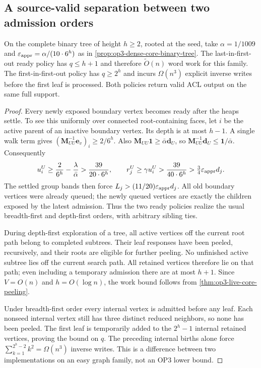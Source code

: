 \subsection{A source-valid separation between two admission orders}

\begin{proposition}
\label{prop:op3-live-core-binary-order}
On the complete binary tree of height $h\geq2$, rooted at the seed, take
$\alpha=1/1009$ and $\varepsilon_{\mathrm{appr}}=\alpha/(10\cdot6^h)$ as in
\cref{prop:op3-dense-core-binary-tree}. The last-in-first-out ready policy
has $q\leq h+1$ and therefore $\widetilde O(n)$ word work for this family.
The first-in-first-out policy has $q\geq2^h$ and incurs
$\Omega(n^3)$ explicit inverse writes before the first leaf is processed.
Both policies return valid ACL output on the same full support.
\end{proposition}
\begin{proof}
Every newly exposed boundary vertex becomes ready after the heaps settle.
To see this uniformly over connected root-containing faces, let $i$ be
the active parent of an inactive boundary vertex. Its depth is at most
$h-1$. A single walk term gives
$(\bm M_{UU}^{-1}\bm e_v)_i\geq2/6^h$.
Also $\bm M_{UU}\bm1\geq\bar\alpha\bm d_U$, so
$\bm M_{UU}^{-1}\bm d_U\leq\bm1/\bar\alpha$. Consequently
\[
 u_i^U\geq\frac2{6^h}-\frac\lambda{\bar\alpha}
 >\frac{39}{20\cdot6^h},\qquad
 r_j^U\geq\gamma u_i^U>\frac{39}{40\cdot6^h}
 >\tfrac34\varepsilon_{\mathrm{appr}} d_j.
\]
The settled group bands then force
$L_j>(11/20)\varepsilon_{\mathrm{appr}} d_j$. All old boundary vertices were already queued;
the newly queued vertices are exactly the children exposed by the latest
admission. Thus the two ready policies realize the usual breadth-first
and depth-first orders, with arbitrary sibling ties.

During depth-first exploration of a tree, all active vertices off the
current root path belong to completed subtrees. Their leaf responses have
been peeled, recursively, and their roots are eligible for further peeling.
No unfinished active subtree lies off the current search path. All retained
vertices therefore lie on that path; even including a temporary admission
there are at most $h+1$. Since $V=O(n)$ and $h=O(\log n)$, the work bound
follows from \cref{thm:op3-live-core-peeling}.

Under breadth-first order every internal vertex is admitted before any
leaf. Each nonseed internal vertex still has three distinct reduced
neighbors, so none has been peeled. The first leaf is temporarily added to
the $2^h-1$ internal retained vertices, proving the bound on $q$. The
preceding internal births alone force
$\sum_{k=1}^{2^h-2}k^2=\Omega(n^3)$ inverse writes. This is a difference
between two implementations on an easy graph family, not an OP3 lower bound.
\end{proof}

